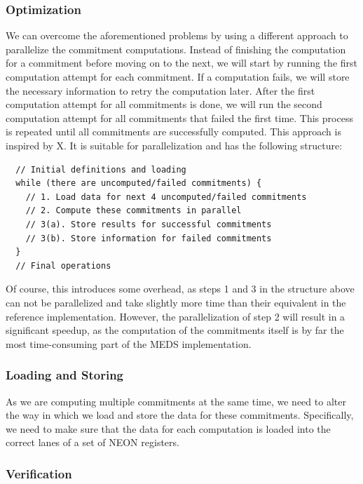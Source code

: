\documentclass[11pt,a4paper]{report}
\theoremstyle{definition}
\begin{document}
\subsubsection{Optimization}
\label{sec:commitmentparallelizationoptimization}
We can overcome the aforementioned problems by using a different approach to parallelize the commitment computations. Instead of finishing the computation for a commitment before moving on to the next, we will start by running the first computation attempt for each commitment. If a computation fails, we will store the necessary information to retry the computation later. After the first computation attempt for all commitments is done, we will run the second computation attempt for all commitments that failed the first time. This process is repeated until all commitments are successfully computed. This approach is inspired by X. It is suitable for parallelization and has the following structure:
\begin{verbatim}
  // Initial definitions and loading
  while (there are uncomputed/failed commitments) {
    // 1. Load data for next 4 uncomputed/failed commitments
    // 2. Compute these commitments in parallel
    // 3(a). Store results for successful commitments
    // 3(b). Store information for failed commitments
  }
  // Final operations
\end{verbatim}
Of course, this introduces some overhead, as steps 1 and 3 in the structure above can not be parallelized and take slightly more time than their equivalent in the reference implementation. However, the parallelization of step 2 will result in a significant speedup, as the computation of the commitments itself is by far the most time-consuming part of the MEDS implementation.

\subsubsection{Loading and Storing}
\label{sec:commitmentparallelizationloadingstoring}
As we are computing multiple commitments at the same time, we need to alter the way in which we load and store the data for these commitments. Specifically, we need to make sure that the data for each computation is loaded into the correct lanes of a set of NEON registers.

\subsubsection{Verification}
\end{document}
